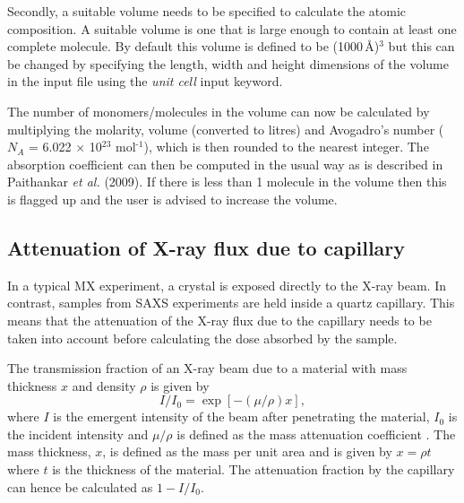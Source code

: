 Secondly, a suitable volume needs to be specified to calculate the atomic composition.
A suitable volume is one that is large enough to contain at least one complete molecule.
By default this volume is defined to be (1000$\,$\AA)$^\text{3}$ but this can be changed by specifying the length, width and height dimensions of the volume in the input file using the \textit{unit cell} input keyword.

The number of monomers/molecules in the volume can now be calculated by multiplying the molarity, volume (converted to litres) and Avogadro's number ($N_A$ = 6.022 $\times$ 10$^{\text{23}}$ mol$^{\text{-1}}$), which is then rounded to the nearest integer.
The absorption coefficient can then be computed in the usual way as is described in Paithankar \textit{et al.} (2009)\nocite{pait2009}.
If there is less than 1 molecule in the volume then this is flagged up and the user is advised to increase the volume.

\subsection{Attenuation of X-ray flux due to capillary}
\label{sub:Attenuation of X-ray flux due to capillary}
In a typical MX experiment, a crystal is exposed directly to the X-ray beam.
In contrast, samples from SAXS experiments are held inside a quartz capillary.
This means that the attenuation of the X-ray flux due to the capillary needs to be taken into account before calculating the dose absorbed by the sample.

The transmission fraction of an X-ray beam due to a material with mass thickness $x$ and density $\rho$ is given by
\begin{equation}
    I/I_0 = \exp \left[ -(\mu/\rho)x\right],
    \label{eq:capillary transmission fraction}
\end{equation}
where $I$ is the emergent intensity of the beam after penetrating the material, $I_0$ is the incident intensity and $\mu/\rho$ is defined as the mass attenuation coefficient \cite{hubbell1995tables}.
The mass thickness, $x$, is defined as the mass per unit area and is given by $x = \rho t$ where $t$ is the thickness of the material.
The attenuation fraction by the capillary can hence be calculated as $1 - I/I_0$.

